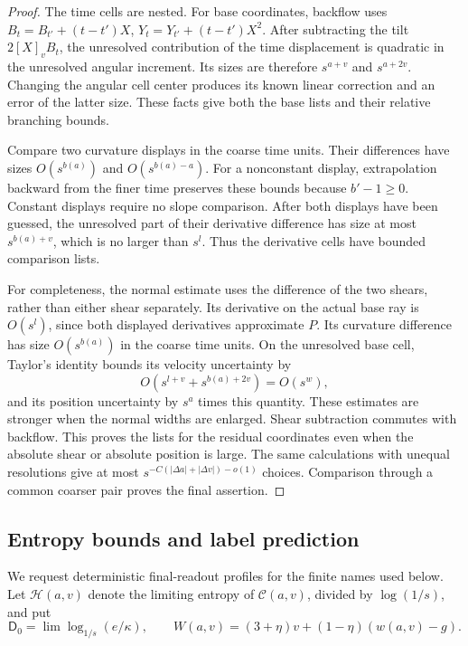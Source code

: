 \begin{proof}
The time cells are nested. For base coordinates, backflow uses
\(B_t=B_{t'}+(t-t')X\), \(Y_t=Y_{t'}+(t-t')X^2\).
After subtracting the tilt \(2[X]_vB_t\), the unresolved contribution
of the time displacement is quadratic in the unresolved angular
increment. Its sizes are therefore \(s^{a+v}\) and \(s^{a+2v}\).
Changing the angular cell center produces its known linear correction
and an error of the latter size. These facts give both the base lists
and their relative branching bounds.

Compare two curvature displays in the coarse time units. Their
differences have sizes \(O(s^{b(a)})\) and
\(O(s^{b(a)-a})\). For a nonconstant display, extrapolation backward
from the finer time preserves these bounds because \(b'-1\geq0\).
Constant displays require no slope comparison. After both displays
have been guessed, the unresolved part of their derivative difference
has size at most \(s^{b(a)+v}\), which is no larger than \(s^l\).
Thus the derivative cells have bounded comparison lists.

For completeness, the normal estimate uses the difference of the two
shears, rather than either shear separately. Its derivative on the
actual base ray is \(O(s^l)\), since both displayed derivatives
approximate \(P\). Its curvature difference has size
\(O(s^{b(a)})\) in the coarse time units. On the unresolved base cell,
Taylor's identity bounds its velocity uncertainty by
\[
 O(s^{l+v}+s^{b(a)+2v})=O(s^w),
\]
and its position uncertainty by \(s^a\) times this quantity.
These estimates are stronger when the normal widths are enlarged.
Shear subtraction commutes with backflow. This proves the lists for
the residual coordinates even when the absolute shear or absolute
position is large. The same calculations with unequal resolutions
give at most \(s^{-C(|\Delta a|+|\Delta v|)-o(1)}\) choices.
Comparison through a common coarser pair proves the final assertion.
\end{proof}

\subsection{Entropy bounds and label prediction}

We request deterministic final-readout profiles for the finite names
used below. Let \(\mathcal H(a,v)\) denote the limiting entropy of
\(\mathcal C(a,v)\), divided by \(\log(1/s)\), and put
\[
 \mathsf D_0=\lim\log_{1/s}(e/\kappa),\qquad
 W(a,v)=(3+\eta)v+(1-\eta)(w(a,v)-g).
\]

